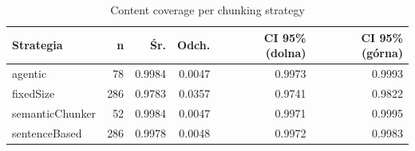 \begin{table}[H]
    \centering
    \caption{Content coverage per chunking strategy}
    \small
    \begin{tabular}{@{}lrrrrr@{}}
        \toprule
        \textbf{Strategia} & \textbf{n} & \textbf{Śr.} & \textbf{Odch.} & \textbf{CI 95\% (dolna)} & \textbf{CI 95\% (górna)} \\
        \midrule
        agentic & 78 & 0.9984 & 0.0047 & 0.9973 & 0.9993 \\
        fixedSize & 286 & 0.9783 & 0.0357 & 0.9741 & 0.9822 \\
        semanticChunker & 52 & 0.9984 & 0.0047 & 0.9971 & 0.9995 \\
        sentenceBased & 286 & 0.9978 & 0.0048 & 0.9972 & 0.9983 \\
        \bottomrule
    \end{tabular}
\end{table}
